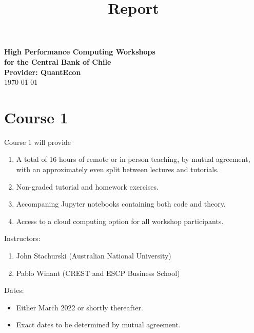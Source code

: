 \documentclass[12pt]{article}
\begin{document}
\title{Report}

\date{}


\begin{center}
    {\bf {\Large High Performance Computing Workshops \\
            for the Central Bank of Chile
    \\
    \vspace{1em}
    Provider: QuantEcon \\
    }}
    \vspace{1em}
    \today
\end{center}


\vspace{.01in}







\thispagestyle{fancy}
\section*{Course 1}

Course 1 will provide 
%
\begin{enumerate}
    \item A total of 16 hours of remote or in person teaching, by mutual
        agreement, with an approximately even split between lectures and
        tutorials.
    \item Non-graded tutorial and homework exercises.
    \item Accompaning Jupyter notebooks containing both code and theory.
    \item Access to a cloud computing option for all workshop participants.
\end{enumerate}

Instructors:
%
\begin{enumerate}
    \item John Stachurski (Australian National University)
    \item Pablo Winant (CREST and ESCP Business School)
\end{enumerate}

Dates: 
%
\begin{itemize}
    \item Either March 2022 or shortly thereafter.
    \item Exact dates to be determined by mutual agreement.
\end{itemize}
\end{document}
